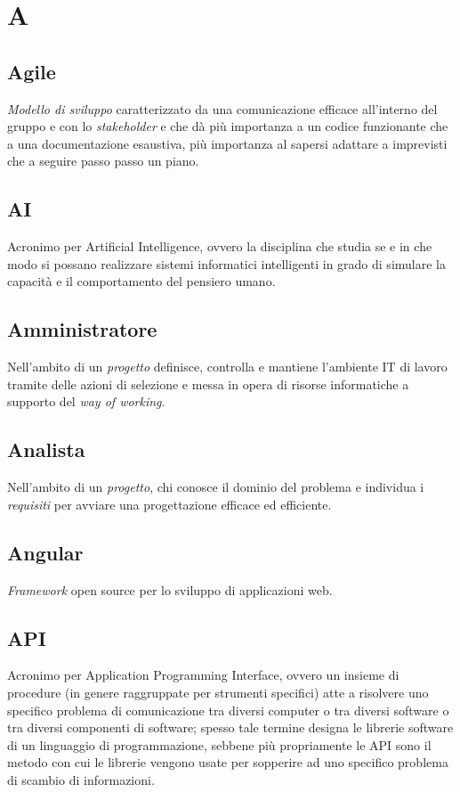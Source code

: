\chapter{A}

\section{Agile}
\emph{Modello di sviluppo} caratterizzato da una comunicazione efficace all'interno del gruppo e con lo \emph{stakeholder} e che dà più importanza a un codice funzionante che a una documentazione esaustiva, più importanza al sapersi adattare a imprevisti che a seguire passo passo un piano.

\section{AI} \label{sec:Artificial Intelligence}
Acronimo per Artificial Intelligence, ovvero la disciplina che studia se e in che modo si possano realizzare sistemi informatici intelligenti in grado di simulare la capacità e il comportamento del pensiero umano.

\section{Amministratore} \label{sec:Amministratori}
Nell'ambito di un \emph{progetto} definisce, controlla e mantiene l'ambiente IT di lavoro tramite delle azioni di selezione e messa in opera di risorse informatiche a supporto del \emph{way of working}. 

\section{Analista}\label{sec:Analisti}
Nell'ambito di un \emph{progetto}, chi conosce il dominio del problema e individua i \emph{requisiti} per avviare una progettazione efficace ed efficiente.

\section{Angular}
\emph{Framework} open source per lo sviluppo di applicazioni web.

\section{API}\label{sec:Application Programming Interface}
Acronimo per Application Programming Interface, ovvero un insieme di procedure (in genere raggruppate per strumenti specifici) atte a risolvere uno specifico problema di comunicazione tra diversi computer o tra diversi software o tra diversi componenti di software; spesso tale termine designa le librerie software di un linguaggio di programmazione, sebbene più propriamente le API sono il metodo con cui le librerie vengono usate per sopperire ad uno specifico problema di scambio di informazioni.


